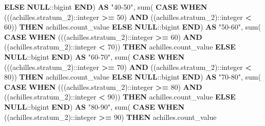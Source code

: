 \documentclass[
]{book}
\newenvironment{Shaded}{\begin{snugshade}}{\end{snugshade}}
\newcommand{\CharTok}[1]{\textcolor[rgb]{0.31,0.60,0.02}{#1}}
\newcommand{\ControlFlowTok}[1]{\textcolor[rgb]{0.13,0.29,0.53}{\textbf{#1}}}
\newcommand{\DecValTok}[1]{\textcolor[rgb]{0.00,0.00,0.81}{#1}}
\newcommand{\FunctionTok}[1]{\textcolor[rgb]{0.00,0.00,0.00}{#1}}
\newcommand{\KeywordTok}[1]{\textcolor[rgb]{0.13,0.29,0.53}{\textbf{#1}}}
\newcommand{\NormalTok}[1]{#1}
\newcommand{\OperatorTok}[1]{\textcolor[rgb]{0.81,0.36,0.00}{\textbf{#1}}}
\newcommand{\OtherTok}[1]{\textcolor[rgb]{0.56,0.35,0.01}{#1}}
\begin{document}
\begin{Shaded}
\begin{Highlighting}[]
           \ControlFlowTok{ELSE} \KeywordTok{NULL}\NormalTok{:}\CharTok{:bigint}
       \ControlFlowTok{END}\NormalTok{) }\KeywordTok{AS} \OtherTok{"40{-}50"}\NormalTok{,}
   \FunctionTok{sum}\NormalTok{(}
       \ControlFlowTok{CASE}
           \ControlFlowTok{WHEN}\NormalTok{ (((achilles.stratum\_2):}\CharTok{:integer} \OperatorTok{\textgreater{}=} \DecValTok{50}\NormalTok{) }\KeywordTok{AND}\NormalTok{ ((achilles.stratum\_2):}\CharTok{:integer} \OperatorTok{\textless{}} \DecValTok{60}\NormalTok{)) }\ControlFlowTok{THEN}\NormalTok{ achilles.count\_value}
           \ControlFlowTok{ELSE} \KeywordTok{NULL}\NormalTok{:}\CharTok{:bigint}
       \ControlFlowTok{END}\NormalTok{) }\KeywordTok{AS} \OtherTok{"50{-}60"}\NormalTok{,}
   \FunctionTok{sum}\NormalTok{(}
       \ControlFlowTok{CASE}
           \ControlFlowTok{WHEN}\NormalTok{ (((achilles.stratum\_2):}\CharTok{:integer} \OperatorTok{\textgreater{}=} \DecValTok{60}\NormalTok{) }\KeywordTok{AND}\NormalTok{ ((achilles.stratum\_2):}\CharTok{:integer} \OperatorTok{\textless{}} \DecValTok{70}\NormalTok{)) }\ControlFlowTok{THEN}\NormalTok{ achilles.count\_value}
           \ControlFlowTok{ELSE} \KeywordTok{NULL}\NormalTok{:}\CharTok{:bigint}
       \ControlFlowTok{END}\NormalTok{) }\KeywordTok{AS} \OtherTok{"60{-}70"}\NormalTok{,}
   \FunctionTok{sum}\NormalTok{(}
       \ControlFlowTok{CASE}
           \ControlFlowTok{WHEN}\NormalTok{ (((achilles.stratum\_2):}\CharTok{:integer} \OperatorTok{\textgreater{}=} \DecValTok{70}\NormalTok{) }\KeywordTok{AND}\NormalTok{ ((achilles.stratum\_2):}\CharTok{:integer} \OperatorTok{\textless{}} \DecValTok{80}\NormalTok{)) }\ControlFlowTok{THEN}\NormalTok{ achilles.count\_value}
           \ControlFlowTok{ELSE} \KeywordTok{NULL}\NormalTok{:}\CharTok{:bigint}
       \ControlFlowTok{END}\NormalTok{) }\KeywordTok{AS} \OtherTok{"70{-}80"}\NormalTok{,}
   \FunctionTok{sum}\NormalTok{(}
       \ControlFlowTok{CASE}
           \ControlFlowTok{WHEN}\NormalTok{ (((achilles.stratum\_2):}\CharTok{:integer} \OperatorTok{\textgreater{}=} \DecValTok{80}\NormalTok{) }\KeywordTok{AND}\NormalTok{ ((achilles.stratum\_2):}\CharTok{:integer} \OperatorTok{\textless{}} \DecValTok{90}\NormalTok{)) }\ControlFlowTok{THEN}\NormalTok{ achilles.count\_value}
           \ControlFlowTok{ELSE} \KeywordTok{NULL}\NormalTok{:}\CharTok{:bigint}
       \ControlFlowTok{END}\NormalTok{) }\KeywordTok{AS} \OtherTok{"80{-}90"}\NormalTok{,}
   \FunctionTok{sum}\NormalTok{(}
       \ControlFlowTok{CASE}
           \ControlFlowTok{WHEN}\NormalTok{ ((achilles.stratum\_2):}\CharTok{:integer} \OperatorTok{\textgreater{}=} \DecValTok{90}\NormalTok{) }\ControlFlowTok{THEN}\NormalTok{ achilles.count\_value}

\end{Highlighting}
\end{Shaded}
\end{document}
